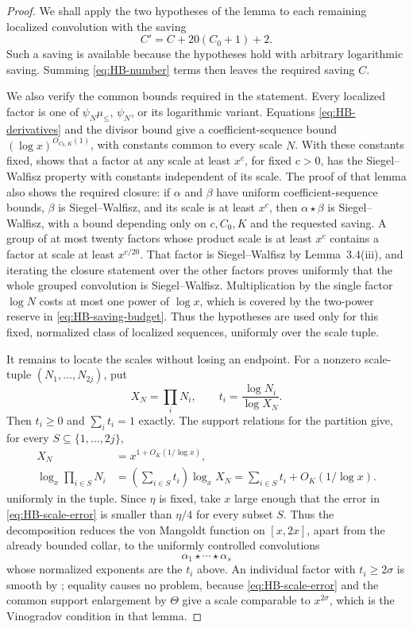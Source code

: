 \documentclass[11pt,reqno]{amsart}
\theoremstyle{definition}
\theoremstyle{remark}
\numberwithin{equation}{section}
\begin{document}
\begin{proof}
We shall apply the two hypotheses of the lemma to each remaining
localized convolution with the saving
\begin{equation}\label{eq:HB-saving-budget}
 C'=C+20(C_0+1)+2.
\end{equation}
Such a saving is available because the hypotheses hold with arbitrary
logarithmic saving. Summing
\eqref{eq:HB-number} terms then leaves the required saving $C$.

We also verify the common bounds required in the statement. Every localized factor is one of
$\psi_N\mu_{\le}$, $\psi_N$, or its logarithmic variant. Equations
\eqref{eq:HB-derivatives} and the divisor bound give a coefficient-sequence
bound $(\log x)^{O_{C_0,K}(1)}$, with constants common to every scale
$N$. With these constants fixed, \cite[Lemma~3.4]{PolymathDistribution}
shows that a factor at any scale at least $x^c$, for fixed $c>0$, has
the Siegel--Walfisz property with constants independent of its scale.
The proof of that lemma also shows the required closure:
if $\alpha$ and $\beta$ have uniform coefficient-sequence bounds,
$\beta$ is Siegel--Walfisz, and its scale is at least $x^c$, then
$\alpha\star\beta$ is Siegel--Walfisz, with a bound depending only on
$c,C_0,K$ and the requested saving. A group of at most twenty factors
whose product scale is at least $x^c$ contains a factor at scale at
least $x^{c/20}$. That factor is Siegel--Walfisz by Lemma~3.4(iii), and
iterating the closure statement over the other factors proves uniformly
that the whole grouped convolution is Siegel--Walfisz. Multiplication by the single factor
$\log N$ costs at most one power of $\log x$, which is covered by the
two-power reserve in \eqref{eq:HB-saving-budget}. Thus the hypotheses
are used only for this fixed, normalized class of localized sequences,
uniformly over the scale tuple.

It remains to locate the scales without losing an endpoint. For a
nonzero scale-tuple $(N_1,\ldots,N_{2j})$, put
\[
 X_N=\prod_iN_i,\qquad
 t_i=\frac{\log N_i}{\log X_N}.
\]
Then $t_i\ge0$ and $\sum_i t_i=1$ exactly. The support relations for
the partition give, for every $S\subseteq\{1,\ldots,2j\}$,
\begin{equation}\label{eq:HB-scale-error}
 \begin{aligned}
 X_N&=x^{1+O_K(1/\log x)},\\
 \log_x\prod_{i\in S}N_i
   &=\left(\sum_{i\in S}t_i\right)\log_xX_N
     =\sum_{i\in S}t_i+O_K(1/\log x).
 \end{aligned}
\end{equation}
uniformly in the tuple. Since $\eta$ is fixed, take $x$ large enough
that the error in \eqref{eq:HB-scale-error} is smaller than $\eta/4$
for every subset $S$. Thus the decomposition reduces the von Mangoldt function on
$[x,2x]$, apart from the already bounded collar, to the uniformly
controlled convolutions
\[
 \alpha_1\star\cdots\star\alpha_s
\]
whose normalized exponents are the $t_i$ above. An individual factor
with $t_i\ge2\sigma$ is smooth by
\cite[Lemma~3.4(ii)]{PolymathDistribution}; equality causes no problem,
because \eqref{eq:HB-scale-error} and the common support enlargement by
$\Theta$ give a scale comparable to $x^{2\sigma}$, which is the
Vinogradov condition in that lemma.


\end{proof}
\end{document}
